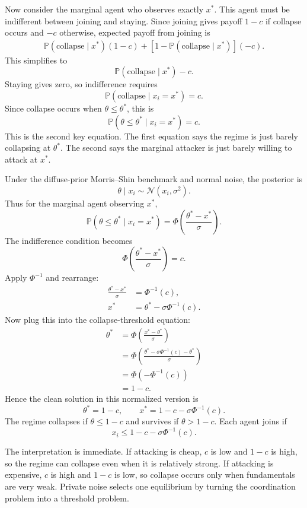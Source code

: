 \documentclass[11pt]{article}
\newcommand{\Prb}{\mathbb{P}}
\begin{document}
Now consider the marginal agent who observes exactly $x^*$. This agent must be indifferent between joining and staying. Since joining gives payoff $1-c$ if collapse occurs and $-c$ otherwise, expected payoff from joining is
\begin{align*}
  \Prb(\text{collapse}\mid x^*)(1-c)
  +\left[1-\Prb(\text{collapse}\mid x^*)\right](-c).
\end{align*}
This simplifies to
\[
  \Prb(\text{collapse}\mid x^*)-c.
\]
Staying gives zero, so indifference requires
\[
  \Prb(\text{collapse}\mid x_i=x^*)=c.
\]
Since collapse occurs when $\theta\le \theta^*$, this is
\[
  \Prb(\theta\le \theta^*\mid x_i=x^*)=c.
\]
This is the second key equation. The first equation says the regime is just barely collapsing at $\theta^*$. The second says the marginal attacker is just barely willing to attack at $x^*$.

Under the diffuse-prior Morris--Shin benchmark and normal noise, the posterior is
\[
  \theta\mid x_i\sim\mathcal{N}(x_i,\sigma^2).
\]
Thus for the marginal agent observing $x^*$,
\[
  \Prb(\theta\le \theta^*\mid x_i=x^*)
  =\Phi\left(\frac{\theta^*-x^*}{\sigma}\right).
\]
The indifference condition becomes
\[
  \Phi\left(\frac{\theta^*-x^*}{\sigma}\right)=c.
\]
Apply $\Phi^{-1}$ and rearrange:
\begin{align*}
  \frac{\theta^*-x^*}{\sigma}&=\Phi^{-1}(c),\\
  x^*&=\theta^*-\sigma\Phi^{-1}(c).
\end{align*}
Now plug this into the collapse-threshold equation:
\begin{align*}
  \theta^*
  &=\Phi\left(\frac{x^*-\theta^*}{\sigma}\right)\\
  &=\Phi\left(\frac{\theta^*-\sigma\Phi^{-1}(c)-\theta^*}{\sigma}\right)\\
  &=\Phi\left(-\Phi^{-1}(c)\right)\\
  &=1-c.
\end{align*}
Hence the clean solution in this normalized version is
\[
  \theta^*=1-c,
  \qquad
  x^*=1-c-\sigma\Phi^{-1}(c).
\]
The regime collapses if $\theta\le 1-c$ and survives if $\theta>1-c$. Each agent joins if
\[
  x_i\le 1-c-\sigma\Phi^{-1}(c).
\]

The interpretation is immediate. If attacking is cheap, $c$ is low and $1-c$ is high, so the regime can collapse even when it is relatively strong. If attacking is expensive, $c$ is high and $1-c$ is low, so collapse occurs only when fundamentals are very weak. Private noise selects one equilibrium by turning the coordination problem into a threshold problem.
\end{document}
